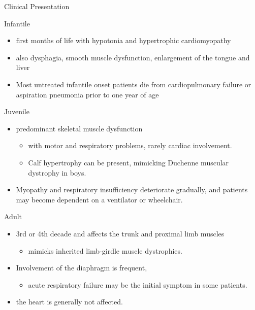 \documentclass[presentation, smaller]{beamer}
\begin{document}
\begin{frame}[label={sec:orgc45513c}]{Clinical Presentation}
\begin{block}{Infantile}
\begin{itemize}
\item first months of life with hypotonia and hypertrophic cardiomyopathy
\item also dysphagia, smooth muscle dysfunction, enlargement of the tongue
and liver
\item Most untreated infantile onset patients die from cardiopulmonary
failure or aspiration pneumonia prior to one year of age
\end{itemize}
\end{block}
\begin{block}{Juvenile}
\begin{itemize}
\item predominant skeletal muscle dysfunction
\begin{itemize}
\item with motor and respiratory problems, rarely cardiac involvement.
\item Calf hypertrophy can be present, mimicking Duchenne muscular dystrophy in boys.
\end{itemize}
\item Myopathy and respiratory insufficiency deteriorate gradually, and patients may become dependent on a ventilator or wheelchair.
\end{itemize}
\end{block}
\begin{block}{Adult}
\begin{itemize}
\item 3rd or 4th decade and affects the trunk and proximal limb muscles
\begin{itemize}
\item mimicks inherited limb-girdle muscle dystrophies.
\end{itemize}
\item Involvement of the diaphragm is frequent,
\begin{itemize}
\item acute respiratory failure may be the initial symptom in some patients.
\end{itemize}
\item the heart is generally not affected.
\end{itemize}
\end{block}
\end{frame}
\end{document}

